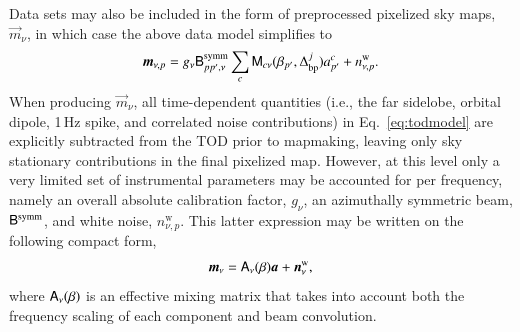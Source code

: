 \documentclass[twocolumn]{aa}
\newcommand{\A}[0]{\tens{A}}
\newcommand{\n}[0]{\vec{n}}
\renewcommand{\a}[0]{\vec{a}}
\newcommand{\m}[0]{\vec{m}}
\newcommand{\B}[0]{\tens{B}}
\newcommand{\M}[0]{\tens{M}}
\newcommand{\Dbp}[0]{\Delta_{\mathrm{bp}}}
\begin{document}
Data sets may also be included in the form of
preprocessed pixelized sky maps, $\m_{\nu}$, in which case the above
data model simplifies to
\begin{equation}
  \m_{\nu,p} = g_{\nu}\B^{\mathrm{symm}}_{pp',\nu}\sum_{c}
    \M_{c\nu}(\beta_{p'}, \Dbp^{j})a^c_{p'} + n^{\mathrm{w}}_{\nu,p}.
  \label{eq:mapmodel}
\end{equation}
When producing $\m_{\nu}$, all time-dependent quantities (i.e., the
far sidelobe, orbital dipole, 1\,Hz spike, and correlated noise
contributions) in Eq.~\eqref{eq:todmodel} are explicitly subtracted
from the TOD prior to mapmaking, leaving only sky stationary
contributions in the final pixelized map. However, at this level only
a very limited set of instrumental parameters may be accounted for per
frequency, namely an overall absolute calibration factor, $g_{\nu}$,
an azimuthally symmetric beam, $\B^{\mathrm{symm}}$, and white noise,
$n^{\mathrm{w}}_{\nu,p}$. This latter expression may be written on the
following compact form,
\begin{equation}
  \m_{\nu} = \A_{\nu}(\beta)\a +\n^{\mathrm{w}}_{\nu},
  \label{eq:binned_map}
\end{equation}
where $\A_{\nu}(\beta)$ is an effective mixing matrix that takes into
account both the frequency scaling of each component and beam
convolution.
\end{document}

